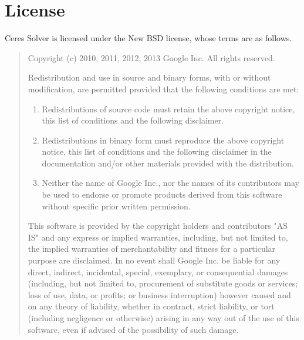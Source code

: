 \chapter{License}
Ceres Solver is licensed under the New BSD license, whose terms are as follows.

\begin{quotation}

\noindent
Copyright (c) 2010, 2011, 2012, 2013 Google Inc. All rights reserved.

\noindent
Redistribution and use in source and binary forms, with or without
modification, are permitted provided that the following conditions are met:
\begin{enumerate}
\item Redistributions of source code must retain the above copyright notice,
      this list of conditions and the following disclaimer.
\item Redistributions in binary form must reproduce the above copyright notice,
      this list of conditions and the following disclaimer in the documentation
      and/or other materials provided with the distribution.
\item Neither the name of Google Inc.,  nor the names of its contributors may
      be used to endorse or promote products derived from this software without
      specific prior written permission.
\end{enumerate}

\noindent
This software is provided by the copyright holders and contributors "AS IS" and
any express or implied warranties, including, but not limited to, the implied
warranties of merchantability and fitness for a particular purpose are
disclaimed. In no event shall Google Inc. be liable for any direct, indirect,
incidental, special, exemplary, or consequential damages (including, but not
limited to, procurement of substitute goods or services; loss of use, data, or
profits; or business interruption) however caused and on any theory of
liability, whether in contract, strict liability, or tort (including negligence
or otherwise) arising in any way out of the use of this software, even if
advised of the possibility of such damage.
\end{quotation}
